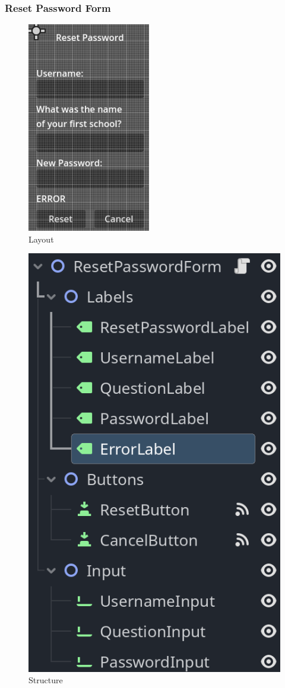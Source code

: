 \documentclass{article}
\begin{document}
        \subsubsection{Reset Password Form}
        \begin{multicols}{2}
                \begin{figure}[H]
                        \centering
                        \includegraphics[width = 0.5\columnwidth]{images/development/ResetPasswordForm_layout.PNG}
                        \caption{Layout}
                \end{figure}
                \begin{figure}[H]
                        \centering
                        \includegraphics[width = 0.6\columnwidth]{images/development/ResetPasswordForm_structure.PNG}
                        \caption{Structure}
                \end{figure}
        \end{multicols}
\end{document}

